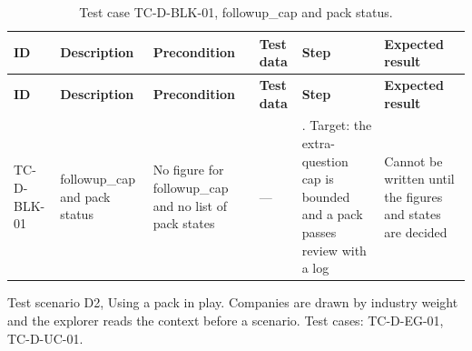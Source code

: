 {\footnotesize{}\renewcommand{\arraystretch}{1.1}
\begin{longtable}{|>{\raggedright\arraybackslash}p{}|>{\raggedright\arraybackslash}p{}|>{\raggedright\arraybackslash}p{}|>{\raggedright\arraybackslash}p{}|>{\raggedright\arraybackslash}p{}|>{\raggedright\arraybackslash}p{}|}
\caption{Test case TC-\allowbreak{}D-\allowbreak{}BLK-\allowbreak{}01, followup\_\allowbreak{}cap and pack status.} \\
\hline
\textbf{ID} & \textbf{Description} & \textbf{Precondition} & \textbf{Test data} & \textbf{Step} & \textbf{Expected result} \\ \hline
\endfirsthead
\hline
\textbf{ID} & \textbf{Description} & \textbf{Precondition} & \textbf{Test data} & \textbf{Step} & \textbf{Expected result} \\ \hline
\endhead
TC-D-BLK-01 & followup\_\allowbreak{}cap and pack status & No figure for followup\_\allowbreak{}cap and no list of pack states & --- & 1. Target: the extra-\allowbreak{}question cap is bounded and a pack passes review with a log & Cannot be written until the figures and states are decided \\ \hline
\end{longtable}
}

Test scenario D2, Using a pack in play. Companies are drawn by industry weight and the explorer reads the context before a scenario. Test cases: TC-D-EG-01, TC-D-UC-01.

